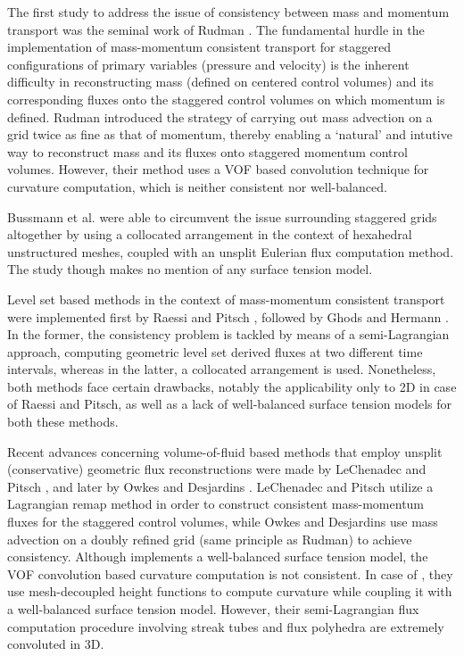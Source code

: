 The first study to address the issue of consistency between mass 
and momentum transport was the seminal work of Rudman .
The fundamental hurdle in the implementation of mass-momentum 
consistent transport for staggered configurations of primary variables 
(pressure and velocity) is the inherent difficulty in reconstructing mass 
(defined on centered control volumes) and its corresponding fluxes 
onto the staggered control volumes on which momentum is defined. 
Rudman introduced the strategy of carrying out mass advection 
on a grid twice as fine as that of momentum, 
thereby enabling a `natural' and intutive 
way to reconstruct mass and its fluxes onto staggered momentum control volumes. 
However, their method uses a VOF based convolution technique for curvature computation, 
which is neither consistent nor well-balanced.    


Bussmann et al.  were able to 
circumvent the issue surrounding staggered grids altogether 
by using a collocated arrangement in the context of hexahedral 
unstructured meshes, coupled with an unsplit Eulerian flux computation method.    
The study though makes no mention of any surface tension model. 


Level set based methods in the context of mass-momentum consistent 
transport were implemented first by Raessi and Pitsch , 
followed by Ghods and Hermann \cite{ghods2013consistent}. 
In the former, the consistency problem is tackled by means of a 
semi-Lagrangian approach, computing geometric level set derived 
fluxes at two different time intervals, whereas in the latter, 
a collocated arrangement is used. 
Nonetheless, both methods face certain drawbacks, notably the 
applicability only to 2D in case of Raessi and Pitsch, 
as well as a lack of well-balanced surface tension models for both these methods.   


Recent advances concerning volume-of-fluid based methods that 
employ unsplit (conservative) geometric flux reconstructions 
were made by LeChenadec and Pitsch 
, and later by Owkes and Desjardins \cite{owkes2017mass}. 
LeChenadec and Pitsch utilize a Lagrangian remap method in order 
to construct consistent mass-momentum fluxes for the staggered control volumes, 
while Owkes and Desjardins use mass advection on a doubly refined grid 
(same principle as Rudman) to achieve consistency.     
Although \cite{le2013monotonicity} implements a well-balanced surface tension model, 
the VOF convolution based curvature computation is not consistent. 
In case of , they use mesh-decoupled height functions 
to compute curvature while coupling it with a well-balanced surface tension model. 
However, their semi-Lagrangian flux computation procedure 
involving streak tubes and flux polyhedra are extremely convoluted in 3D.     


